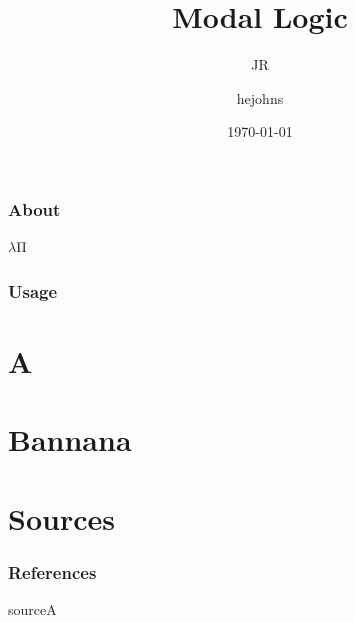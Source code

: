 \documentclass[aspectratio=169]{beamer}
\begin{document}
\beamertemplatenavigationsymbolsempty
{}
\title[Judgmental Reconstruction]{Modal Logic}
\subtitle{JR}
\author{hejohns}
\date{\today}
\begin{frame}
    \titlepage
\end{frame}
\begin{frame}
    \frametitle{About}
    $λ$Π
\end{frame}
\begin{frame}
    \frametitle{Usage}
\end{frame}
\section{A}
\section{Bannana}
\section{Sources}
\begin{frame}[allowframebreaks]
    \frametitle{References}
    \begin{thebibliography}{00}
        sourceA
    \end{thebibliography}
\end{frame}
\end{document}
